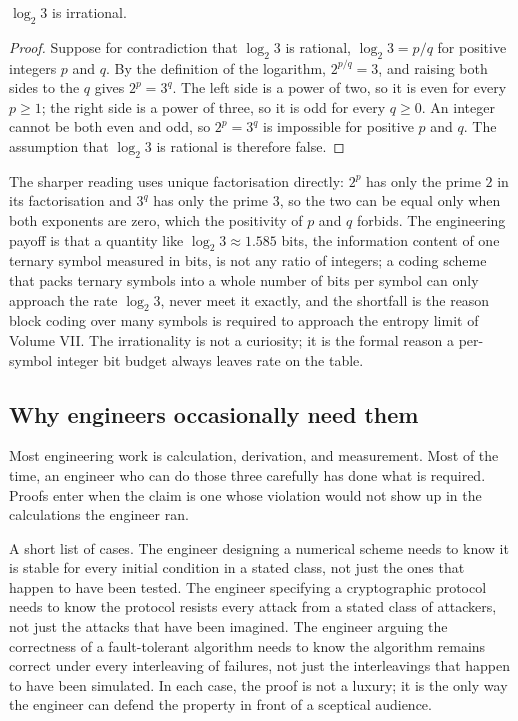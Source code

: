 \begin{theorem}
$\log_{2} 3$ is irrational.
\end{theorem}

\begin{proof}
Suppose for contradiction that $\log_{2} 3$ is rational, $\log_{2} 3 =
p/q$ for positive integers $p$ and $q$. By the definition of the
logarithm, $2^{p/q} = 3$, and raising both sides to the $q$ gives
$2^{p} = 3^{q}$. The left side is a power of two, so it is even for every
$p \geq 1$; the right side is a power of three, so it is odd for every
$q \geq 0$. An integer cannot be both even and odd, so $2^{p} = 3^{q}$ is
impossible for positive $p$ and $q$. The assumption that $\log_{2} 3$ is
rational is therefore false.
\end{proof}

The sharper reading uses unique factorisation directly: $2^{p}$ has only
the prime $2$ in its factorisation and $3^{q}$ has only the prime $3$, so
the two can be equal only when both exponents are zero, which the
positivity of $p$ and $q$ forbids. The engineering payoff is that a
quantity like $\log_{2} 3 \approx 1.585$ bits, the information content of
one ternary symbol measured in bits, is not any ratio of integers; a
coding scheme that packs ternary symbols into a whole number of bits per
symbol can only approach the rate $\log_{2} 3$, never meet it exactly,
and the shortfall is the reason block coding over many symbols is
required to approach the entropy limit of Volume VII. The irrationality
is not a curiosity; it is the formal reason a per-symbol integer bit
budget always leaves rate on the table.

\subsection{Why engineers occasionally need them}

Most engineering work is calculation, derivation, and measurement.
Most of the time, an engineer who can do those three carefully has
done what is required. Proofs enter when the claim is one whose
violation would not show up in the calculations the engineer ran.

A short list of cases. The engineer designing a numerical scheme
needs to know it is stable for every initial condition in a stated
class, not just the ones that happen to have been tested. The
engineer specifying a cryptographic protocol needs to know the
protocol resists every attack from a stated class of attackers, not
just the attacks that have been imagined. The engineer arguing the
correctness of a fault-tolerant algorithm needs to know the algorithm
remains correct under every interleaving of failures, not just the
interleavings that happen to have been simulated. In each case, the
proof is not a luxury; it is the only way the engineer can defend
the property in front of a sceptical audience.

